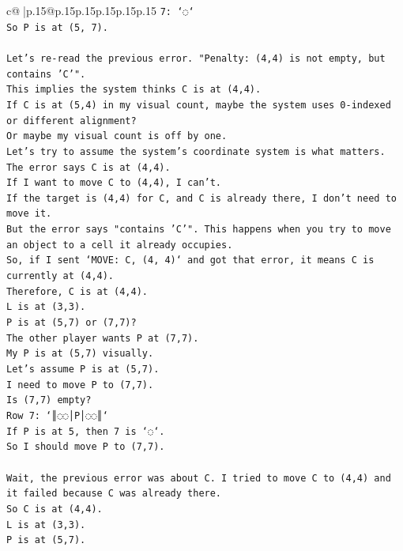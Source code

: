 \documentclass{article}
\begin{document}
{\begin{supertabular}{c@{$\;$}|p{.15\linewidth}@{}p{.15\linewidth}p{.15\linewidth}p{.15\linewidth}p{.15\linewidth}p{.15\linewidth}}
{{{\texttt{7: `◌`} \\
\texttt{So P is at (5, 7).} \\
\\ 
\texttt{Let's re{-}read the previous error. "Penalty: (4,4) is not empty, but contains 'C'".} \\
\texttt{This implies the system thinks C is at (4,4).} \\
\texttt{If C is at (5,4) in my visual count, maybe the system uses 0{-}indexed or different alignment?} \\
\texttt{Or maybe my visual count is off by one.} \\
\texttt{Let's try to assume the system's coordinate system is what matters.} \\
\texttt{The error says C is at (4,4).} \\
\texttt{If I want to move C to (4,4), I can't.} \\
\texttt{If the target is (4,4) for C, and C is already there, I don't need to move it.} \\
\texttt{But the error says "contains 'C'". This happens when you try to move an object to a cell it already occupies.} \\
\texttt{So, if I sent `MOVE: C, (4, 4)` and got that error, it means C is currently at (4,4).} \\
\texttt{Therefore, C is at (4,4).} \\
\texttt{L is at (3,3).} \\
\texttt{P is at (5,7) or (7,7)?} \\
\texttt{The other player wants P at (7,7).} \\
\texttt{My P is at (5,7) visually.} \\
\texttt{Let's assume P is at (5,7).} \\
\texttt{I need to move P to (7,7).} \\
\texttt{Is (7,7) empty?} \\
\texttt{Row 7: `║◌◌│P│◌◌║`} \\
\texttt{If P is at 5, then 7 is `◌`.} \\
\texttt{So I should move P to (7,7).} \\
\\ 
\texttt{Wait, the previous error was about C. I tried to move C to (4,4) and it failed because C was already there.} \\
\texttt{So C is at (4,4).} \\
\texttt{L is at (3,3).} \\
\texttt{P is at (5,7).} \\
}}}
\end{supertabular}}
\end{document}
